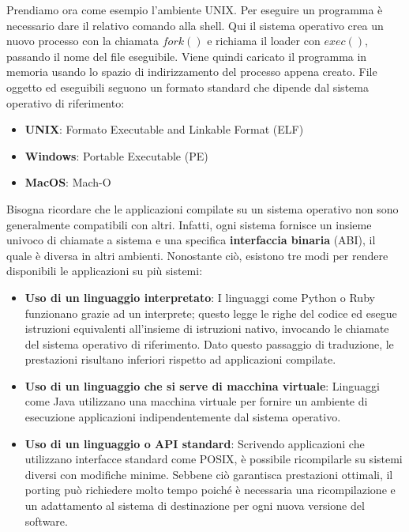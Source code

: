\noindent Prendiamo ora come esempio l'ambiente UNIX. Per eseguire un programma è necessario dare il relativo comando alla shell. Qui il sistema operativo crea un nuovo processo con la chiamata $fork()$ e richiama il loader con $exec()$, passando il nome del file eseguibile. Viene quindi caricato il programma in memoria usando lo spazio di indirizzamento del processo appena creato. File oggetto ed eseguibili seguono un formato standard che dipende dal sistema operativo di riferimento: \begin{itemize}
	\item \textbf{UNIX}: Formato Executable and Linkable Format (ELF)
	\item \textbf{Windows}: Portable Executable (PE)
	\item \textbf{MacOS}: Mach-O
\end{itemize}
\noindent Bisogna ricordare che le applicazioni compilate su un sistema operativo non sono generalmente compatibili con altri. Infatti, ogni sistema fornisce un insieme univoco di chiamate a sistema e una specifica \textbf{interfaccia binaria} (ABI), il quale è diversa in altri ambienti. Nonostante ciò, esistono tre modi per rendere disponibili le applicazioni su più sistemi: \begin{itemize}
	\item \textbf{Uso di un linguaggio interpretato}: I linguaggi come Python o Ruby funzionano grazie ad un interprete; questo legge le righe del codice ed esegue istruzioni equivalenti all'insieme di istruzioni nativo, invocando le chiamate del sistema operativo di riferimento. Dato questo passaggio di traduzione, le prestazioni risultano inferiori rispetto ad applicazioni compilate.
	\item \textbf{Uso di un linguaggio che si serve di macchina virtuale}: Linguaggi come Java utilizzano una macchina virtuale per fornire un ambiente di esecuzione applicazioni indipendentemente dal sistema operativo.
	\item \textbf{Uso di un linguaggio o API standard}: Scrivendo applicazioni che utilizzano interfacce standard come POSIX, è possibile ricompilarle su sistemi diversi con modifiche minime. Sebbene ciò garantisca prestazioni ottimali, il porting può richiedere molto tempo poiché è necessaria una ricompilazione e un adattamento al sistema di destinazione per ogni nuova versione del software.
\end{itemize}

%

